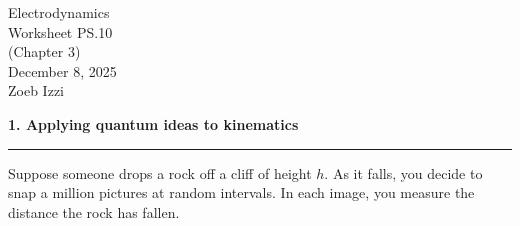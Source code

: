 \documentclass{article}
\begin{document}
\thispagestyle{plain}

\begin{center}
    {\Large Electrodynamics}\\
    {\Large Worksheet PS.10}\\
    \vspace{0.2cm}
    (Chapter 3)\\
    December 8, 2025\\
    Zoeb Izzi
\end{center}

\vspace{0.5cm}

\noindent \textbf{1. Applying quantum ideas to kinematics}
\hrule
\vspace{0.3cm}

\noindent Suppose someone drops a rock off a cliff of height $h$. As it falls, you decide to snap a million pictures at random intervals. In each image, you measure the distance the rock has fallen.
\end{document}
